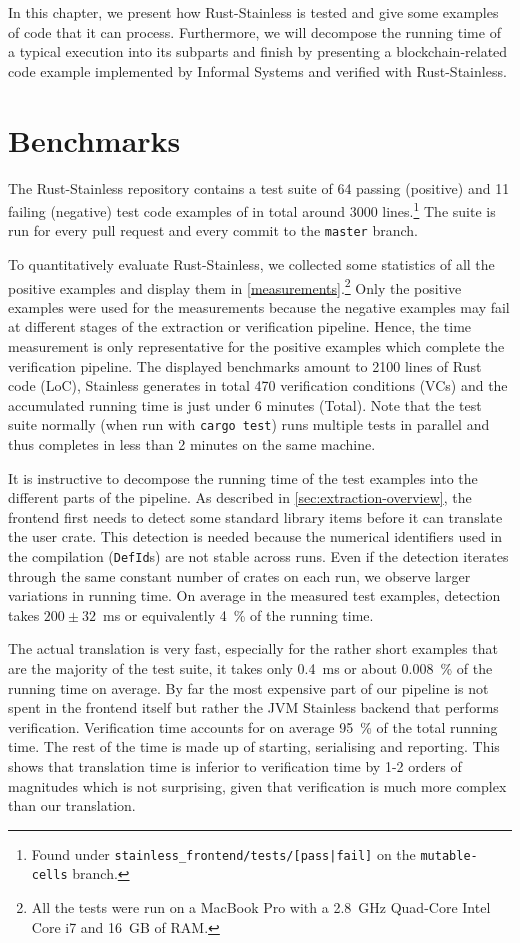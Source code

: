 In this chapter, we present how Rust-Stainless is tested and give some examples
of code that it can process. Furthermore, we will decompose the running time of
a typical execution into its subparts and finish by presenting a
blockchain-related code example implemented by Informal Systems and verified
with Rust-Stainless.

\section{Benchmarks}

The Rust-Stainless repository contains a test suite of 64 passing (positive) and
11 failing (negative) test code examples of in total around 3000
lines.\footnote{Found under \texttt{stainless\_frontend/tests/[pass|fail]}
on the \texttt{mutable-cells} branch.} The suite is run for every pull request
and every commit to the \texttt{master} branch.

To quantitatively evaluate Rust-Stainless, we collected some statistics of all
the positive examples and display them in \autoref{measurements}.\footnote{All
the tests were run on a MacBook Pro with a 2.8~GHz Quad-Core Intel Core i7 and
16~GB of RAM.} Only the positive examples were used for the measurements because
the negative examples may fail at different stages of the extraction or
verification pipeline. Hence, the time measurement is only representative for
the positive examples which complete the verification pipeline. The displayed
benchmarks amount to 2100 lines of Rust code (LoC), Stainless generates in total
470 verification conditions (VCs) and the accumulated running time is just under
6 minutes (Total). Note that the test suite normally (when run with
\texttt{cargo test}) runs multiple tests in parallel and thus completes in less
than 2 minutes on the same machine.

It is instructive to decompose the running time of the test examples into the
different parts of the pipeline. As described in
\autoref{sec:extraction-overview}, the frontend first needs to detect some
standard library items before it can translate the user crate. This detection is
needed because the numerical identifiers used in the compilation
(\lstinline!DefId!s) are not stable across runs. Even if the detection iterates
through the same constant number of crates on each run, we observe larger
variations in running time. On average in the measured test examples, detection
takes $200 \pm 32$~ms or equivalently 4~\% of the running time.

The actual translation is very fast, especially for the rather short examples
that are the majority of the test suite, it takes only 0.4~ms or about 0.008~\%
of the running time on average. By far the most expensive part of our pipeline
is not spent in the frontend itself but rather the JVM Stainless backend that
performs verification. Verification time accounts for on average 95~\% of the
total running time. The rest of the time is made up of starting, serialising and
reporting. This shows that translation time is inferior to verification time by
1-2 orders of magnitudes which is not surprising, given that verification is
much more complex than our translation.

